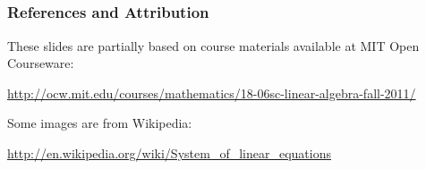 \documentclass[compress]{beamer}
\newcommand{\black}[1]{{\color{black}#1}}
\begin{document}
\subsection*{}

\begin{frame}
\frametitle{References and Attribution}

\small

These slides are partially based on course materials available at MIT Open Courseware:

\vspace{.5cm}
\black{\url{http://ocw.mit.edu/courses/mathematics/18-06sc-linear-algebra-fall-2011/}}


\vspace{1cm}

Some images are from Wikipedia:

\vspace{.5cm}
\black{\url{http://en.wikipedia.org/wiki/System_of_linear_equations}}






\end{frame}
\end{document}
